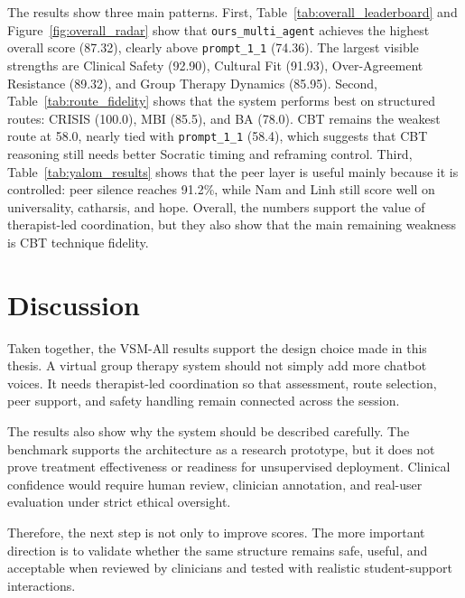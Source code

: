 The results show three main patterns. First, Table~\ref{tab:overall_leaderboard} and Figure~\ref{fig:overall_radar} show that \texttt{ours\_multi\_agent} achieves the highest overall score (87.32), clearly above \texttt{prompt\_1\_1} (74.36). The largest visible strengths are Clinical Safety (92.90), Cultural Fit (91.93), Over-Agreement Resistance (89.32), and Group Therapy Dynamics (85.95). Second, Table~\ref{tab:route_fidelity} shows that the system performs best on structured routes: CRISIS (100.0), MBI (85.5), and BA (78.0). CBT remains the weakest route at 58.0, nearly tied with \texttt{prompt\_1\_1} (58.4), which suggests that CBT reasoning still needs better Socratic timing and reframing control. Third, Table~\ref{tab:yalom_results} shows that the peer layer is useful mainly because it is controlled: peer silence reaches 91.2\%, while Nam and Linh still score well on universality, catharsis, and hope. Overall, the numbers support the value of therapist-led coordination, but they also show that the main remaining weakness is CBT technique fidelity.



\section{Discussion}

Taken together, the VSM-All results support the design choice made in this thesis. A virtual group therapy system should not simply add more chatbot voices. It needs therapist-led coordination so that assessment, route selection, peer support, and safety handling remain connected across the session.

The results also show why the system should be described carefully. The benchmark supports the architecture as a research prototype, but it does not prove treatment effectiveness or readiness for unsupervised deployment. Clinical confidence would require human review, clinician annotation, and real-user evaluation under strict ethical oversight.

Therefore, the next step is not only to improve scores. The more important direction is to validate whether the same structure remains safe, useful, and acceptable when reviewed by clinicians and tested with realistic student-support interactions.
